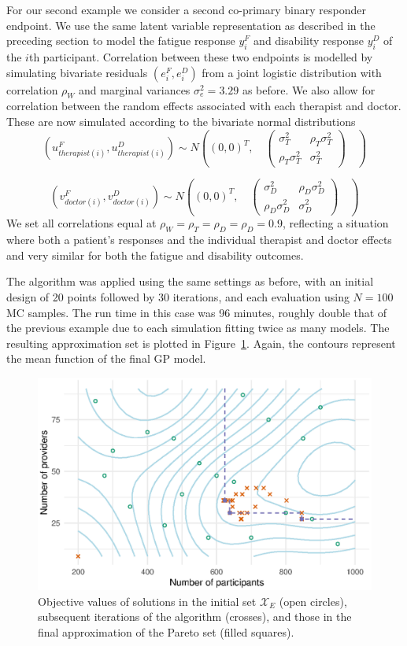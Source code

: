 \documentclass{article}
\begin{document}
For our second example we consider a second co-primary binary responder endpoint. We use the same latent variable representation as described in the preceding section to model the fatigue response $y_i^F$ and disability response $y_i^D$ of the $i$th participant. Correlation between these two endpoints is modelled by simulating bivariate residuals $(e_i^F, e_i^D)$ from a joint logistic distribution with correlation $\rho_W$ and marginal variances $\sigma_e^2 = 3.29$ as before. We also allow for correlation between the random effects associated with each therapist and doctor. These are now simulated according to the bivariate normal distributions
$$
(u_{therapist(i)}^F, u_{therapist(i)}^D) \sim N\left( (0,0)^T, \quad
\begin{pmatrix} 
\sigma_T^2 & \rho_T \sigma_T^2 \\
\rho_T \sigma_T^2  & \sigma_T^2 
\end{pmatrix}
\quad \right)
$$

$$
(v_{doctor(i)}^F, v_{doctor(i)}^D) \sim N\left( (0,0)^T, \quad
\begin{pmatrix} 
\sigma_D^2  & \rho_D \sigma_D^2  \\
\rho_D \sigma_D^2  & \sigma_D^2 
\end{pmatrix}
\quad \right)
$$
We set all correlations equal at $\rho_W = \rho_T = \rho_D = \rho_D = 0.9$, reflecting a situation where both a patient's responses and the individual therapist and doctor effects and very similar for both the fatigue and disability outcomes. 

The algorithm was applied using the same settings as before, with an initial design of 20 points followed by 30 iterations, and each evaluation using $N = 100$ MC samples. The run time in this case was 96 minutes, roughly double that of the previous example due to each simulation fitting twice as many models. The resulting approximation set is plotted in Figure~\ref{fig:ex2_single_run}. Again, the contours represent the mean function of the final GP model. 

\begin{figure}
\centering
\includegraphics[scale=0.8]{ex2_single_run}
\caption{Objective values of solutions in the initial set $\mathcal{X}_{E}$ (open circles), subsequent iterations of the algorithm (crosses), and those in the final approximation of the Pareto set (filled squares).}
\label{fig:ex2_single_run}
\end{figure}
\end{document}
